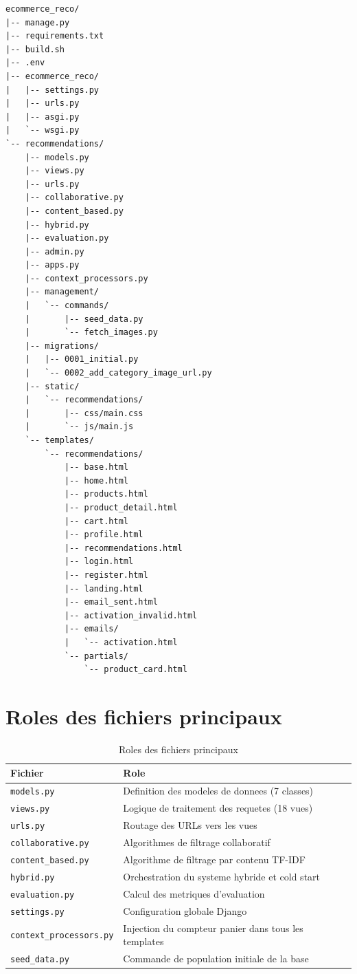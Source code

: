 \documentclass[12pt,a4paper]{report}
\newcommand{\fichier}[1]{\texttt{#1}}
\begin{document}
\begin{lstlisting}[language={},caption={Arborescence du projet},label={lst:tree}]
ecommerce_reco/
|-- manage.py
|-- requirements.txt
|-- build.sh
|-- .env
|-- ecommerce_reco/
|   |-- settings.py
|   |-- urls.py
|   |-- asgi.py
|   `-- wsgi.py
`-- recommendations/
    |-- models.py
    |-- views.py
    |-- urls.py
    |-- collaborative.py
    |-- content_based.py
    |-- hybrid.py
    |-- evaluation.py
    |-- admin.py
    |-- apps.py
    |-- context_processors.py
    |-- management/
    |   `-- commands/
    |       |-- seed_data.py
    |       `-- fetch_images.py
    |-- migrations/
    |   |-- 0001_initial.py
    |   `-- 0002_add_category_image_url.py
    |-- static/
    |   `-- recommendations/
    |       |-- css/main.css
    |       `-- js/main.js
    `-- templates/
        `-- recommendations/
            |-- base.html
            |-- home.html
            |-- products.html
            |-- product_detail.html
            |-- cart.html
            |-- profile.html
            |-- recommendations.html
            |-- login.html
            |-- register.html
            |-- landing.html
            |-- email_sent.html
            |-- activation_invalid.html
            |-- emails/
            |   `-- activation.html
            `-- partials/
                `-- product_card.html
\end{lstlisting}

\section{Roles des fichiers principaux}

\begin{table}[h]
\centering
\begin{tabularx}{\linewidth}{@{}lX@{}}
\toprule
\textbf{Fichier} & \textbf{Role} \\
\midrule
\fichier{models.py}         & Definition des modeles de donnees (7 classes) \\
\fichier{views.py}          & Logique de traitement des requetes (18 vues) \\
\fichier{urls.py}           & Routage des URLs vers les vues \\
\fichier{collaborative.py}  & Algorithmes de filtrage collaboratif \\
\fichier{content\_based.py} & Algorithme de filtrage par contenu TF-IDF \\
\fichier{hybrid.py}         & Orchestration du systeme hybride et cold start \\
\fichier{evaluation.py}     & Calcul des metriques d'evaluation \\
\fichier{settings.py}       & Configuration globale Django \\
\fichier{context\_processors.py} & Injection du compteur panier dans tous les templates \\
\fichier{seed\_data.py}     & Commande de population initiale de la base \\
\bottomrule
\end{tabularx}
\caption{Roles des fichiers principaux}
\end{table}
\end{document}
